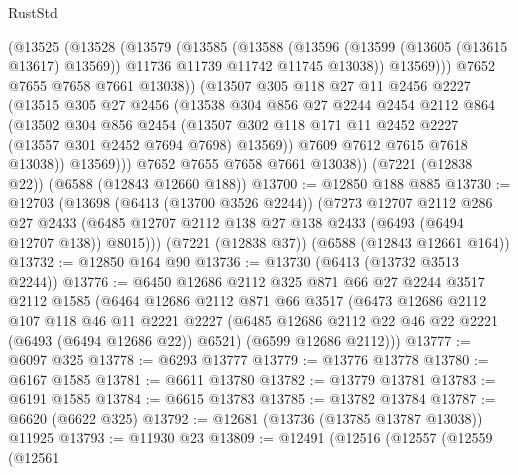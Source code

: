 \begin{lexlean}{RustStd}
\begin{coremodule}
              (@13525
                (@13528
                  (@13579
                    (@13585
                      (@13588
                        (@13596
                          (@13599 (@13605 (@13615 @13617) @13569))
                          @11736
                          @11739
                          @11742
                          @11745
                          @13038))
                      @13569)))
                @7652
                @7655
                @7658
                @7661
                @13038))
            (@13507
              @305
              @118
              @27
              @11
              @2456
              @2227
              (@13515
                @305
                @27
                @2456
                (@13538
                  @304
                  @856
                  @27
                  @2244
                  @2454
                  @2112
                  @864
                  (@13502
                    @304
                    @856
                    @2454
                    (@13507 @302 @118 @171 @11 @2452 @2227 (@13557 @301 @2452 @7694 @7698) @13569))
                  @7609
                  @7612
                  @7615
                  @7618
                  @13038))
              @13569)))
        @7652
        @7655
        @7658
        @7661
        @13038))
    (@7221 (@12838 @22))
    (@6588 (@12843 @12660 @188))
@13700 := @12850 @188 @885
@13730 := @12703
    (@13698
      (@6413 (@13700 @3526 @2244))
      (@7273
        @12707
        @2112
        @286
        @27
        @2433
        (@6485 @12707 @2112 @138 @27 @138 @2433 (@6493 (@6494 @12707 @138)) @8015)))
    (@7221 (@12838 @37))
    (@6588 (@12843 @12661 @164))
@13732 := @12850 @164 @90
@13736 := @13730 (@6413 (@13732 @3513 @2244))
@13776 := @6450
    @12686
    @2112
    @325
    @871
    @66
    @27
    @2244
    @3517
    @2112
    @1585
    (@6464
      @12686
      @2112
      @871
      @66
      @3517
      (@6473
        @12686
        @2112
        @107
        @118
        @46
        @11
        @2221
        @2227
        (@6485 @12686 @2112 @22 @46 @22 @2221 (@6493 (@6494 @12686 @22)) @6521)
        (@6599 @12686 @2112)))
@13777 := @6097 @325
@13778 := @6293 @13777
@13779 := @13776 @13778
@13780 := @6167 @1585
@13781 := @6611 @13780
@13782 := @13779 @13781
@13783 := @6191 @1585
@13784 := @6615 @13783
@13785 := @13782 @13784
@13787 := @6620 (@6622 @325)
@13792 := @12681 (@13736 (@13785 @13787 @13038)) @11925
@13793 := @11930 @23
@13809 := @12491
    (@12516
      (@12557
        (@12559
          (@12561

\end{coremodule}
\end{lexlean}
